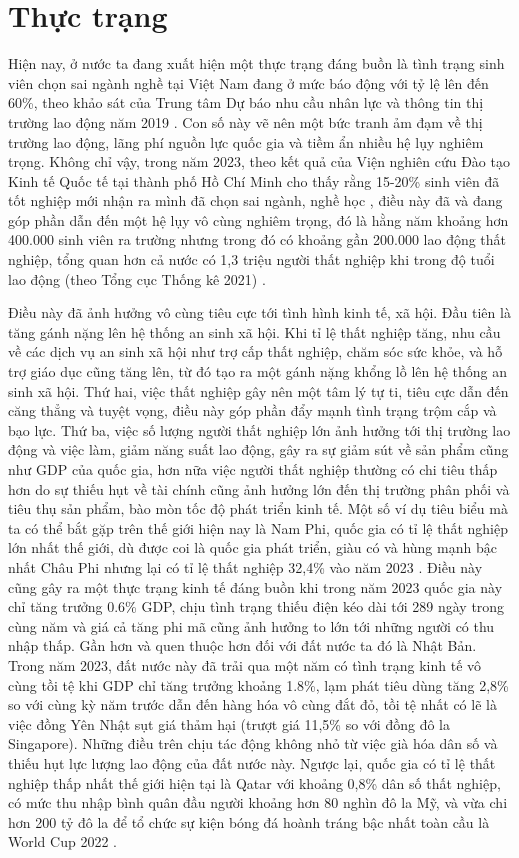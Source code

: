 \section{Thực trạng}
Hiện nay, ở nước ta đang xuất hiện một thực trạng đáng buồn là tình trạng sinh viên chọn sai ngành nghề tại Việt Nam đang ở mức báo động với tỷ lệ lên đến 60\%, theo khảo sát của Trung tâm Dự báo nhu cầu nhân lực và thông tin thị trường lao động năm 2019 \cite{tienphong}. Con số này vẽ nên một bức tranh ảm đạm về thị trường lao động, lãng phí nguồn lực quốc gia và tiềm ẩn nhiều hệ lụy nghiêm trọng. Không chỉ vậy, trong năm 2023, theo kết quả của Viện nghiên cứu Đào tạo Kinh tế Quốc tế tại thành phố Hồ Chí Minh cho thấy rằng 15-20\% sinh viên đã tốt nghiệp mới nhận ra mình đã chọn sai ngành, nghề học \cite{thanhnien1}, điều này đã và đang góp phần dẫn đến một hệ lụy vô cùng nghiêm trọng, đó là hằng năm khoảng hơn 400.000 sinh viên ra trường nhưng trong đó có khoảng gần 200.000 lao động thất nghiệp, tổng quan hơn cả nước có 1,3 triệu người thất nghiệp khi trong độ tuổi lao động (theo Tổng cục Thống kê 2021) \cite{thanhnien2}. 

Điều này đã ảnh hưởng vô cùng tiêu cực tới tình hình kinh tế, xã hội. Đầu tiên là tăng gánh nặng lên hệ thống an sinh xã hội. Khi tỉ lệ thất nghiệp tăng, nhu cầu về các dịch vụ an sinh xã hội như trợ cấp thất nghiệp, chăm sóc sức khỏe, và hỗ trợ giáo dục cũng tăng lên, từ đó tạo ra một gánh nặng khổng lồ lên hệ thống an sinh xã hội. Thứ hai, việc thất nghiệp gây nên một tâm lý tự ti, tiêu cực dẫn đến căng thẳng và tuyệt vọng, điều này góp phần đẩy mạnh tình trạng trộm cắp và bạo lực. Thứ ba, việc số lượng người thất nghiệp lớn ảnh hưởng tới thị trường lao động và việc làm, giảm năng suất lao động, gây ra sự giảm sút về sản phẩm cũng như GDP của quốc gia, hơn nữa việc người thất nghiệp thường có chi tiêu thấp hơn do sự thiếu hụt về tài chính cũng ảnh hưởng lớn đến thị trường phân phối và tiêu thụ sản phẩm, bào mòn tốc độ phát triển kinh tế. Một số ví dụ tiêu biểu mà ta có thể bắt gặp trên thế giới hiện nay là Nam Phi, quốc gia có tỉ lệ thất nghiệp lớn nhất thế giới, dù được coi là quốc gia phát triển, giàu có và hùng mạnh bậc nhất Châu Phi nhưng lại có tỉ lệ thất nghiệp 32,4\% vào năm 2023 \cite{Investopedia}. Điều này cũng gây ra một thực trạng kinh tế đáng buồn khi trong năm 2023 quốc gia này chỉ tăng trưởng 0.6\% GDP, chịu tình trạng thiếu điện kéo dài tới 289 ngày trong cùng năm và giá cả tăng phi mã cũng ảnh hưởng to lớn tới những người có thu nhập thấp. Gần hơn và quen thuộc hơn đối với đất nước ta đó là Nhật Bản. Trong năm 2023, đất nước này đã trải qua một năm có tình trạng kinh tế vô cùng tồi tệ khi GDP chỉ tăng trưởng khoảng 1.8\%, lạm phát tiêu dùng tăng 2,8\% so với cùng kỳ năm trước dẫn đến hàng hóa vô cùng đắt đỏ, tồi tệ nhất có lẽ là việc đồng Yên Nhật sụt giá thảm hại (trượt giá 11,5\% so với đồng đô la Singapore). Những điều trên chịu tác động không nhỏ từ việc già hóa dân số và thiếu hụt lực lượng lao động của đất nước này. Ngược lại, quốc gia có tỉ lệ thất nghiệp thấp nhất thế giới hiện tại là Qatar với khoảng 0,8\% dân số thất nghiệp, có mức thu nhập bình quân đầu người khoảng hơn 80 nghìn đô la Mỹ, và vừa chi hơn 200 tỷ đô la để tổ chức sự kiện bóng đá hoành tráng bậc nhất toàn cầu là World Cup 2022 \cite{Investopedia}.

